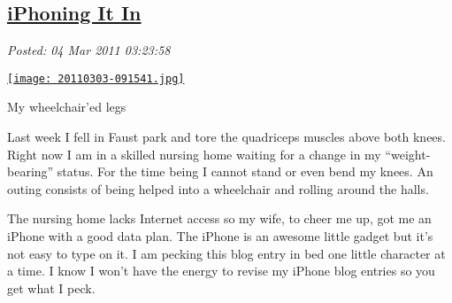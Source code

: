 %

\subsection*{\href{https://bakerjd99.wordpress.com/2011/03/03/iphoning-it-in/}{iPhoning It In}}


\noindent\emph{Posted: 04 Mar 2011 03:23:58}
\vspace{6pt}

\captionsetup[floatingfigure]{labelformat=empty}
\begin{floatingfigure}[r]{0.29\textwidth}
\centering
\href{http://bakerjd99.files.wordpress.com/2011/03/20110303-091541.jpg}{\texttt{[image: 20110303-091541.jpg]}}
\caption{My wheelchair'ed legs}
\label{fig:1184X0}
\end{floatingfigure}Last week I fell in Faust park and tore the quadriceps muscles above
both knees. Right now I am in a skilled nursing home waiting for a
change in my ``weight-bearing'' status. For the time being I cannot
stand or even bend my knees. An outing consists of being helped into a
wheelchair and rolling around the halls.

The nursing home lacks Internet access so my wife, to cheer me up, got
me an iPhone with a good data plan. The iPhone is an awesome little
gadget but it's not easy to type on it. I am pecking this blog entry in
bed one little character at a time. I know I won't have the energy to
revise my iPhone blog entries so you get what I peck.





%